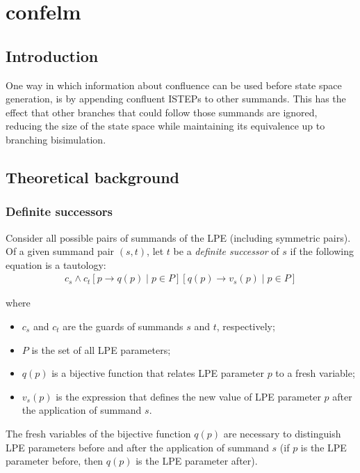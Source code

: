 \chapter{confelm}

\section{Introduction}
One way in which information about confluence can be used before state space generation, is by appending confluent ISTEPs to other summands.
This has the effect that other branches that could follow those summands are ignored, reducing the size of the state space while maintaining its equivalence up to branching bisimulation.

\section{Theoretical background}

\subsection{Definite successors}

Consider all possible pairs of summands of the LPE (including symmetric pairs).
Of a given summand pair $(s, t)$, let $t$ be a \emph{definite successor} of $s$ if the following equation is a tautology:
\begin{align*}
c_s \land {c_t}[p \rightarrow q(p) \;|\; p \in P][q(p) \rightarrow v_s(p) \;|\; p \in P]
\end{align*}

where

\begin{itemize}
\item $c_s$ and $c_t$ are the guards of summands $s$ and $t$, respectively;
\item $P$ is the set of all LPE parameters;
\item $q(p)$ is a bijective function that relates LPE parameter $p$ to a fresh variable;
\item $v_s(p)$ is the expression that defines the new value of LPE parameter $p$ after the application of summand $s$.
\end{itemize}

The fresh variables of the bijective function $q(p)$ are necessary to distinguish LPE parameters before and after the application of summand $s$ (if $p$ is the LPE parameter before, then $q(p)$ is the LPE parameter after).

